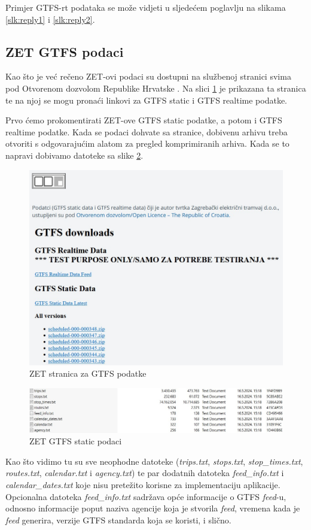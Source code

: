 \documentclass[zavrsnirad]{fer}
\begin{document}
Primjer GTFS-rt podataka se može vidjeti u sljedećem poglavlju na slikama \ref{slk:reply1} i \ref{slk:reply2}.

\subsection{ZET GTFS podaci}
\label{sec:zet-gtfs}

Kao što je već rečeno ZET-ovi podaci su dostupni na službenoj stranici svima pod Otvorenom dozvolom Republike Hrvatske \cite{ZET-GTFS}. Na slici \ref{slk:zet-stranica} je prikazana ta stranica te na njoj se mogu pronaći linkovi za GTFS static i GTFS realtime podatke.

Prvo ćemo prokomentirati ZET-ove GTFS static podatke, a potom i GTFS realtime podatke. Kada se podaci dohvate sa stranice, dobivenu arhivu treba otvoriti s odgovarajućim alatom za pregled komprimiranih arhiva. Kada se to napravi dobivamo datoteke sa slike \ref{slk:zet-podaci}.

\begin{figure}[htb]
	\centering
	\includegraphics[width=0.7\linewidth]{Figures/zet-stranica.jpg} 
	\caption{ZET stranica za GTFS podatke}
	\label{slk:zet-stranica}
\end{figure} 

\begin{figure}[htb]
	\centering
	\includegraphics[width=0.7\linewidth]{Figures/zet-podaci.jpg} 
	\caption{ZET GTFS static podaci}
	\label{slk:zet-podaci}
\end{figure} 

Kao što vidimo tu su sve neophodne datoteke (\textit{trips.txt}, \textit{stops.txt}, \textit{stop\_times.txt}, \textit{routes.txt}, \textit{calendar.txt} i \textit{agency.txt}) te par dodatnih datoteka \textit{feed\_info.txt} i \textit{calendar\_dates.txt} koje nisu pretežito korisne za implementaciju aplikacije. Opcionalna datoteka \textit{feed\_info.txt} sadržava opće informacije o GTFS \textit{feed}-u, odnosno  informacije poput naziva agencije koja je stvorila \textit{feed}, vremena kada je \textit{feed} generira, verzije GTFS standarda koja se koristi, i slično.
\end{document}
